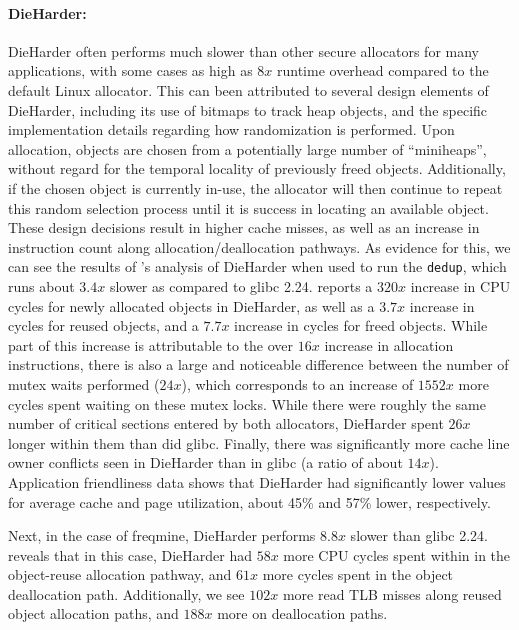 \paragraph{DieHarder:}
DieHarder often performs much slower than other secure allocators for many applications, with some cases as high as $8x$ runtime overhead compared to the default Linux allocator. This can been attributed to several design elements of DieHarder, including its use of bitmaps to track heap objects, and the specific implementation details regarding how randomization is performed. Upon allocation, objects are chosen from a potentially large number of ``miniheaps'', without regard for the temporal locality of previously freed objects. Additionally, if the chosen object is currently in-use, the allocator will then continue to repeat this random selection process until it is success in locating an available object. These design decisions result in higher cache misses, as well as an increase in instruction count along allocation/deallocation pathways.
As evidence for this, we can see the results of \MP{}'s analysis of DieHarder when used to run the \texttt{dedup}, which runs about $3.4x$ slower as compared to glibc 2.24. \MP{} reports a $320x$ increase in CPU cycles for newly allocated objects in DieHarder, as well as a $3.7x$ increase in cycles for reused objects, and a $7.7x$ increase in cycles for freed objects.
While part of this increase is attributable to the over $16x$ increase in allocation instructions, there is also a large and noticeable difference between the number of mutex waits performed ($24x$), which corresponds to an increase of $1552x$ more cycles spent waiting on these mutex locks. While there were roughly the same number of critical sections entered by both allocators, DieHarder spent $26x$ longer within them than did glibc.
Finally, there was significantly more cache line owner conflicts seen in DieHarder than in glibc (a ratio of about $14x$). Application friendliness data shows that DieHarder had significantly lower values for average cache and page utilization, about 45\% and 57\% lower, respectively.

Next, in the case of freqmine, DieHarder performs $8.8x$ slower than glibc 2.24. \MP{} reveals that in this case, DieHarder had $58x$ more CPU cycles spent within in the object-reuse allocation pathway, and $61x$ more cycles spent in the object deallocation path.
	Additionally, we see $102x$ more read TLB misses along reused object allocation paths, and $188x$ more on deallocation paths.
	
